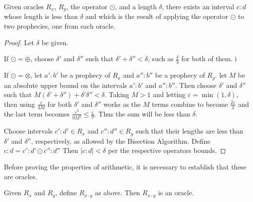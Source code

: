 \begin{lemma}
    Given oracles $R_x$, $R_y$, the operator $\odot$, and a length $\delta$, there exists an interval $c:d$ whose length is less than $\delta$ and which is the result of applying the operator $\odot$ to two prophecies, one from each oracle. 
\end{lemma}

\begin{proof}
    Let $\delta$ be given. 

    If $\odot = \oplus$, choose $\delta'$ and $\delta''$ such that $\delta' + \delta'' < \delta$, such as $\frac{\delta}{3}$ for both of them. i

    If $\odot = \otimes$, let $a':b'$ be a prophecy of $R_x$ and $a'':b''$ be a prophecy of $R_y$. let $M$ be an absolute upper bound on the intervals $a':b'$ and $a'':b''$. Then choose $\delta'$ and $\delta''$ such that $M (\delta' + \delta'') + \delta' \delta'' < \delta$. Taking $M> 1$ and letting $\varepsilon = \min(1, \delta)$, then using $\frac{\varepsilon}{3M}$ for both $\delta'$ and $\delta''$ works as the $M$ terms combine to become $\frac{2 \varepsilon}{3}$ and the last term becomes $\frac{\varepsilon^2}{9M^2} \leq \frac{\varepsilon}{9}$. Thus the sum will be less than $\delta$.

    Choose intervals $c':d' \in R_x$ and $c'':d'' \in R_y$  such that their lengths are less than $\delta'$ and $\delta''$, respectively, as allowed by the Bisection Algorithm. Define $c:d = c':d' \odot c'':d''$ Then $|c:d| < \delta$ per the respective operators bounds. 

    
    
\end{proof}

Before proving the properties of arithmetic, it is necessary to establish that these are oracles. 

\begin{proposition}
    Given $R_x$ and $R_y$, define $R_{x \cdot y}$ as above. Then $R_{x \cdot y}$ is an oracle. 
\end{proposition}

